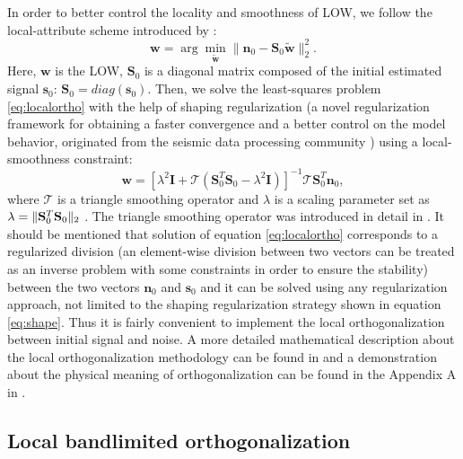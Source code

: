 In order to better control the locality and smoothness of LOW, we follow the local-attribute scheme introduced by \cite{fomel2007localattr}: %
\begin{equation}
\label{eq:localortho}
\mathbf{w} = \arg\min_{\mathbf{\tilde{w}}} \parallel \mathbf{n}_0 - \mathbf{S}_0\mathbf{\tilde{w}}\parallel_2^2. %
\end{equation}
Here, $\mathbf{w}$ is the LOW, $\mathbf{S}_0$ is a diagonal matrix composed of the initial estimated signal $\mathbf{s}_0$: $\mathbf{S}_0=diag(\mathbf{s}_0)$.
Then, we solve the least-squares problem \ref{eq:localortho} with the help of shaping regularization (a novel regularization framework for obtaining a faster convergence and a better control on the model behavior, originated from the seismic data processing community \cite{fomel2007shape}) using a local-smoothness constraint:
\begin{equation}
\label{eq:shape}
\mathbf{w} = [\lambda^2\mathbf{I} + \mathcal{T}(\mathbf{S}_0^T\mathbf{S}_0-\lambda^2\mathbf{I})]^{-1}\mathcal{T}\mathbf{S}_0^T\mathbf{n}_0,
\end{equation}
where $\mathcal{T}$ is a triangle smoothing operator and $\lambda$ is a scaling parameter set as $\lambda  = \Arrowvert\mathbf{S}_0^T\mathbf{S}_0\Arrowvert_2$ \cite{fomel2007localattr}. The triangle smoothing operator was introduced in detail in \cite{fomel2007shape}. It should be mentioned that solution of equation \ref{eq:localortho} corresponds to a regularized division (an element-wise division between two vectors can be treated as an inverse problem with some constraints in order to ensure the stability) between the two vectors $\mathbf{n}_0$ and $\mathbf{s}_0$ and it can be solved using any regularization approach, not limited to the shaping regularization strategy shown in equation \ref{eq:shape}. Thus it is fairly convenient to implement the local orthogonalization between initial signal and noise. A more detailed mathematical description about the local orthogonalization methodology can be found in \cite{yangkang2015ortho} and a demonstration about the physical meaning of orthogonalization can be found in the Appendix A in \cite{yangkang2015ortho}. 

\subsection{Local bandlimited orthogonalization}

